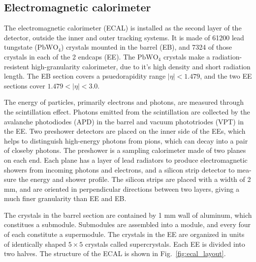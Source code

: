 \subsection{Electromagnetic calorimeter}

The electromagnetic calorimeter (ECAL) is installed as the second layer of the detector, outside the inner and outer tracking systems. It is made of
61200 lead tungstate ($\textrm{PbWO}_{4}$) crystals mounted in the barrel (EB), and 7324 of those crystals in each of the 2 endcaps (EE). 
The $\textrm{PbWO}_{4}$ crystals make
a radiation-resistent high-granularity calorimeter, due to it's high density and short radiation length. The EB section covers a psuedorapidity range
$|\eta| < 1.479$, and the two EE sections cover $1.479 < |\eta| < 3.0$.

The energy of particles, primarily electrons and photons, are measured through the scintillation effect. Photons emitted from the scintillation are 
collected by the avalanche photodiodes (APD) in the barrel and vacuum phototriodes (VPT) in the EE. Two preshower detectors are placed on the inner side
of the EEs, which helps to distinguish high-energy photons from pions, which can decay into a pair of closeby photons. The preshower is a sampling 
calorimeter made of two planes on each end. Each plane has a layer of lead radiators to produce electromagnetic showers from incoming photons and electrons, 
and a silicon strip detector to mea- sure the energy and shower profile. The silicon strips are placed with a width of 2 mm, and are oriented in perpendicular 
directions between two layers, giving a much finer granularity than EE and EB. 

The crystals in the barrel section are contained by 1 mm wall of aluminum, which constitues a submodule. Submodules are assembled into a module, 
and every four of each constitute a supermodule. The crystals in the EE are organized in units of identically shaped $5 \times 5$ crystals called supercrystals. 
Each EE is divided into two halves. The structure of the ECAL is shown in Fig.~\ref{fig:ecal_layout}.

